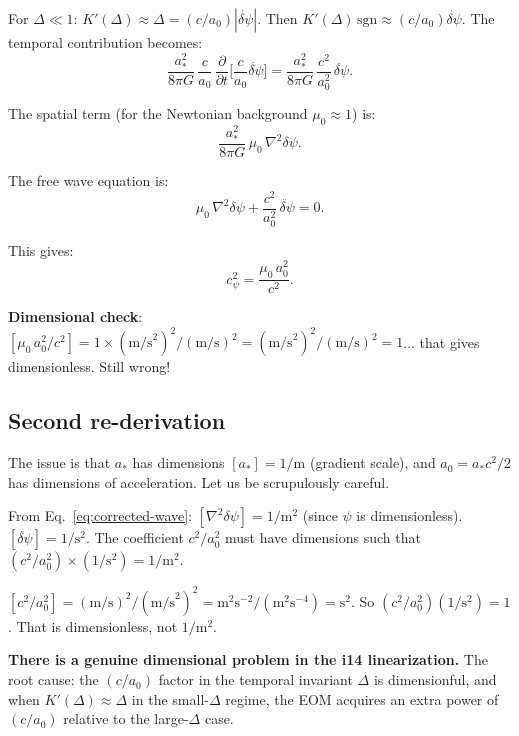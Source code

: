 \documentclass[11pt]{article}
\begin{document}
For $\Delta \ll 1$: $K'(\Delta) \approx \Delta = (c/a_0)|\dot{\delta\psi}|$.
Then $K'(\Delta)\,\text{sgn} \approx (c/a_0)\dot{\delta\psi}$.
The temporal contribution becomes:
\begin{equation}
\frac{a_*^2}{8\pi G}\,\frac{c}{a_0}\,\frac{\partial}{\partial t}\biggl[
\frac{c}{a_0}\dot{\delta\psi}\biggr]
= \frac{a_*^2}{8\pi G}\,\frac{c^2}{a_0^2}\,\ddot{\delta\psi}.
\end{equation}

The spatial term (for the Newtonian background $\mu_0 \approx 1$) is:
\begin{equation}
\frac{a_*^2}{8\pi G}\,\mu_0\,\nabla^2\delta\psi.
\end{equation}

The free wave equation is:
\begin{equation}
\mu_0\,\nabla^2\delta\psi + \frac{c^2}{a_0^2}\,\ddot{\delta\psi} = 0.
\label{eq:corrected-wave}
\end{equation}

This gives:
\begin{equation}
\boxed{c_\psi^2 = \frac{\mu_0\,a_0^2}{c^2}.}
\label{eq:cpsi-corrected}
\end{equation}

\textbf{Dimensional check}: $[\mu_0\,a_0^2/c^2] = 1 \times
(\text{m/s}^2)^2/(\text{m/s})^2 = (\text{m/s}^2)^2/(\text{m/s})^2
= 1$... that gives dimensionless. Still wrong!

\subsection{Second re-derivation}

The issue is that $a_*$ has dimensions $[a_*] = 1/\text{m}$ (gradient scale),
and $a_0 = a_* c^2/2$ has dimensions of acceleration. Let us be
scrupulously careful.

From Eq.~\eqref{eq:corrected-wave}: $[\nabla^2\delta\psi] = 1/\text{m}^2$
(since $\psi$ is dimensionless). $[\ddot{\delta\psi}] = 1/\text{s}^2$.
The coefficient $c^2/a_0^2$ must have dimensions such that
$(c^2/a_0^2) \times (1/\text{s}^2) = 1/\text{m}^2$.

$[c^2/a_0^2] = (\text{m/s})^2/(\text{m/s}^2)^2 = \text{m}^2\text{s}^{-2}/
(\text{m}^2\text{s}^{-4}) = \text{s}^2$. So $(c^2/a_0^2)(1/\text{s}^2) =
1$. That is dimensionless, not $1/\text{m}^2$.

\textbf{There is a genuine dimensional problem in the i14 linearization.}
The root cause: the $(c/a_0)$ factor in the temporal invariant $\Delta$
is dimensionful, and when $K'(\Delta) \approx \Delta$ in the small-$\Delta$
regime, the EOM acquires an extra power of $(c/a_0)$ relative to the
large-$\Delta$ case.
\end{document}
